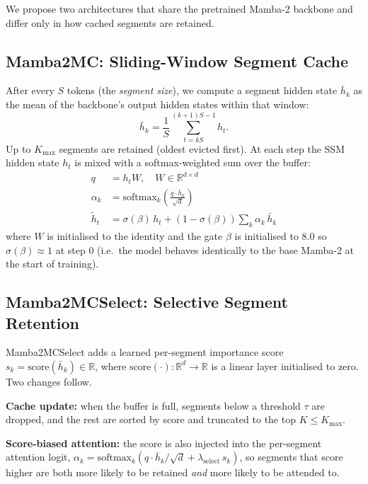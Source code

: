 \documentclass[conference]{IEEEtran}
\begin{document}
We propose two architectures that share the pretrained Mamba-2 backbone and differ only in how cached segments are retained.

\subsection{Mamba2MC: Sliding-Window Segment Cache}

After every $S$ tokens (the \emph{segment size}), we compute a segment hidden state $\bar h_k$ as the mean of the backbone's output hidden states within that window:
\begin{equation}
    \bar{h}_k = \frac{1}{S}\sum_{t=kS}^{(k+1)S-1} h_t.
\end{equation}
Up to $K_{\max}$ segments are retained (oldest evicted first). At each step the SSM hidden state $h_t$ is mixed with a softmax-weighted sum over the buffer:
\begin{align}
    q &= h_t W,\quad W \in \mathbb{R}^{d \times d}\\
    \alpha_k &= \mathrm{softmax}_k\!\left(\frac{q\cdot \bar h_k}{\sqrt{d}}\right)\\
    \tilde{h}_t &= \sigma(\beta)\, h_t + (1-\sigma(\beta))\sum_{k}\alpha_k\, \bar h_k
\end{align}
where $W$ is initialised to the identity and the gate $\beta$ is initialised to $8.0$ so $\sigma(\beta)\!\approx\!1$ at step 0 (i.e.\ the model behaves identically to the base Mamba-2 at the start of training).

\subsection{Mamba2MCSelect: Selective Segment Retention}

Mamba2MCSelect adds a learned per-segment importance score $s_k = \mathrm{score}(\bar h_k) \in \mathbb R$, where $\mathrm{score}(\cdot): \mathbb R^d \to \mathbb R$ is a linear layer initialised to zero. Two changes follow.

\textbf{Cache update:} when the buffer is full, segments below a threshold $\tau$ are dropped, and the rest are sorted by score and truncated to the top $K\le K_{\max}$.

\textbf{Score-biased attention:} the score is also injected into the per-segment attention logit, $\alpha_k = \mathrm{softmax}_k(q\cdot \bar h_k/\sqrt d + \lambda_{\text{select}}\, s_k)$, so segments that score higher are both more likely to be retained \emph{and} more likely to be attended to.
\end{document}
